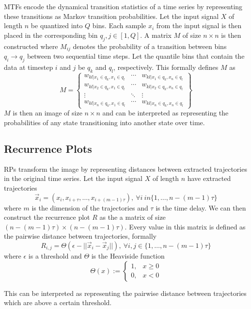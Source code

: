 MTFs \cite{wang2015imaging} encode the dynamical transition statistics of a time series by representing these transitions as Markov transition probabilities.
Let the input signal $X$ of length $n$ be quantized into $Q$ bins.
Each sample $x_i$ from the input signal is then placed in the corresponding bin $q_j, j \in [1, Q]$.
A matrix $M$ of size $n \times n$ is then constructed where $M_{ij}$ denotes the probability of a transition between bins $q_i \rightarrow q_j$ between two sequential time steps. 
Let the quantile bins that contain the data at timestep $i$ and $j$ be $q_k$ and $q_l$, respectively.
This formally defines $M$ as
\begin{equation}
	M = \begin{Bmatrix}
			w_{kl|x_1 \in q_k, x_1 \in q_l} & \cdots & w_{kl|x_1 \in q_k, x_n \in q_l} \\
			w_{kl|x_2 \in q_k, x_1 \in q_l} & \cdots & w_{kl|x_2 \in q_k, x_n \in q_l} \\
			\vdots                          & \ddots & \vdots                          \\
			w_{kl|x_n \in q_k, x_1 \in q_l} & \cdots & w_{kl|x_n \in q_k, x_n \in q_l}
		\end{Bmatrix}
\end{equation}
$M$ is then an image of size $n \times n$ and can be interpreted as representing the probabilities of any state transitioning into another state over time.

\subsection{Recurrence Plots}

RPs \cite{eckmann1995recurrence} transform the image by representing distances between extracted trajectories in the original time series.
Let the input signal $X$ of length $n$ have extracted trajectories
\begin{equation}
	\vec{x}_i = \left(x_i, x_{i+\tau},\ldots, x_{i+(m-1)\tau}\right), ~ \forall i \ in \{1,\ldots,n-(m-1)\tau\}
\end{equation}
where $m$ is the dimension of the trajectories and $\tau$ is the time delay.
We can then construct the recurrence plot $R$ as the a matrix of size $\left(n - (m-1)\tau\right) \times \left(n - (m-1)\tau\right)$.
Every value in this matrix is defined as the pairwise distance between trajectories, formally
\begin{equation}
	R_{i,j} = \Theta\left(\epsilon - ||\vec{x}_i - \vec{x}_j|| \right),~\forall i,j \in \{1, \ldots, n-(m-1)\tau\}
\end{equation}
where $\epsilon$ is a threshold and $\Theta$ is the Heaviside function
\begin{equation}
	\Theta(x) := \begin{cases}
		1, & x \geq 0\\
		0, & x < 0
	\end{cases}
\end{equation}

This can be interpreted as representing the pairwise distance between trajectories which are above a certain threshold.
